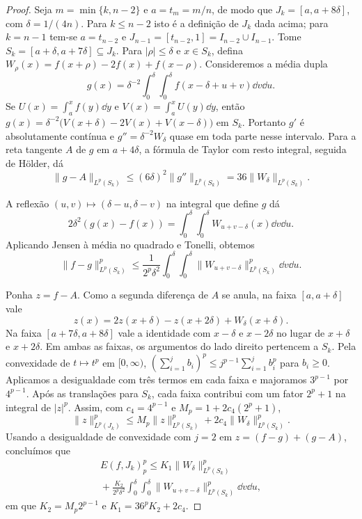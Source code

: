 \documentclass[12pt,a4paper]{article}
\begin{document}
\begin{proof}
Seja $m=\min\{k,n-2\}$ e $a=t_m=m/n$, de modo que $J_k=[a,a+8\delta]$, com $\delta=1/(4n)$. Para $k\le n-2$ isto é a definição de $J_k$ dada acima; para $k=n-1$ tem-se $a=t_{n-2}$ e $J_{n-1}=[t_{n-2},1]=I_{n-2}\cup I_{n-1}$. Tome $S_k=[a+\delta,a+7\delta]\subseteq J_k$. Para $|\rho|\le\delta$ e $x\in S_k$, defina $W_\rho(x)=f(x+\rho)-2f(x)+f(x-\rho)$. Consideremos a média dupla
\[
 g(x)=\delta^{-2}\int_0^\delta\!\!\int_0^\delta
            f(x-\delta+u+v)\dd v\dd u.
\]
Se $U(x)=\int_a^x f(y)\dd y$ e $V(x)=\int_a^x U(y)\dd y$, então
$g(x)=\delta^{-2}\big(V(x+\delta)-2V(x)+V(x-\delta)\big)$ em $S_k$.
Portanto $g'$ é absolutamente contínua e $g''=\delta^{-2}W_\delta$ quase em toda parte nesse intervalo. Para a reta tangente $A$ de $g$ em $a+4\delta$, a fórmula de Taylor com resto integral, seguida de Hölder, dá
\[
 \|g-A\|_{L^p(S_k)}
 \le (6\delta)^2\|g''\|_{L^p(S_k)}
 =36\|W_\delta\|_{L^p(S_k)} .
\]

A reflexão $(u,v)\mapsto(\delta-u,\delta-v)$ na integral que define $g$ dá
\[
 2\delta^2(g(x)-f(x))
 =\int_0^\delta\!\!\int_0^\delta W_{u+v-\delta}(x)\dd v\dd u .
\]
Aplicando Jensen à média no quadrado e Tonelli, obtemos
\[
 \|f-g\|_{L^p(S_k)}^p
 \le \frac{1}{2^p\delta^2}\int_0^\delta\!\!\int_0^\delta
        \|W_{u+v-\delta}\|_{L^p(S_k)}^p\dd v\dd u .
\]

Ponha $z=f-A$. Como a segunda diferença de $A$ se anula, na faixa $[a,a+\delta]$ vale
\[
 z(x)=2z(x+\delta)-z(x+2\delta)+W_\delta(x+\delta).
\]
Na faixa $[a+7\delta,a+8\delta]$ vale a identidade com $x-\delta$ e $x-2\delta$ no lugar de $x+\delta$ e $x+2\delta$. Em ambas as faixas, os argumentos do lado direito pertencem a $S_k$. Pela convexidade de $t\mapsto t^p$ em $[0,\infty)$,
$(\sum_{i=1}^j b_i)^p\le j^{p-1}\sum_{i=1}^j b_i^p$ para $b_i\ge0$. Aplicamos a desigualdade com três termos em cada faixa e majoramos $3^{p-1}$ por $4^{p-1}$. Após as translações para $S_k$, cada faixa contribui com um fator $2^p+1$ na integral de $|z|^p$. Assim, com $c_4=4^{p-1}$ e $M_p=1+2c_4(2^p+1)$,
\[
 \|z\|_{L^p(J_k)}^p
 \le M_p\|z\|_{L^p(S_k)}^p+2c_4\|W_\delta\|_{L^p(S_k)}^p.
\]
Usando a desigualdade de convexidade com $j=2$ em $z=(f-g)+(g-A)$, concluímos que
\begin{multline*}
 E(f,J_k)_p^p\le
 K_1\|W_\delta\|_{L^p(S_k)}^p\\
 {}+\frac{K_2}{2^p\delta^2}\int_0^\delta\!\!\int_0^\delta
 \|W_{u+v-\delta}\|_{L^p(S_k)}^p\dd v\dd u ,
\end{multline*}
em que $K_2=M_p2^{p-1}$ e $K_1=36^pK_2+2c_4$.


\end{proof}
\end{document}
